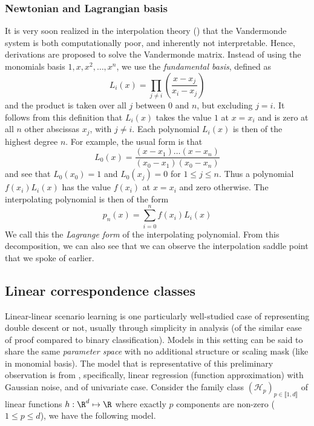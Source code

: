 \subsubsection{Newtonian and Lagrangian basis}

It is very soon realized in the interpolation theory (\cite{McArtneyInterpolation2003}) that the Vandermonde system is both computationally poor, and inherently not interpretable. Hence, derivations are proposed to solve the Vandermonde matrix. Instead of using the monomials basis $1,x,x^{2},\dots,x^{n}$, we use the \textit{fundamental basis}, defined as 
\begin{equation}
  L_{i}(x) = \prod_{j\ne i} \left(
    \frac{x-x_j}{x_i - x_j}
  \right)
\end{equation}
and the product is taken over all $j$ between $0$ and $n$, but excluding $j=i$. It follows from this definition that $L_{i}(x)$ takes the value $1$ at $x=x_{i}$ and is zero at all $n$ other abscissas $x_{j}$, with $j\neq i$. Each polynomial $L_{i}(x)$ is then of the highest degree $n$. For example, the usual form is that 
\begin{equation}
  L_{0}(x) = \frac{(x-x_1)\dots(x-x_{n})}{(x_0 - x_1)(x_0 - x_n)}
\end{equation}
and see that $L_{0}(x_0)=1$ and $L_0 (x_j)=0$ for $1\le j \le n$. Thus a polynomial $f(x_i)L_{i}(x)$ has the value $f(x_i)$ at $x=x_{i}$ and zero otherwise. The interpolating polynomial is then of the form 
\begin{equation}
  p_{n}(x) = \sum^{n}_{i=0} f(x_i)L_{i}(x)
\end{equation}
We call this the \textit{Lagrange form} of the interpolating polynomial. From this decomposition, we can also see that we can observe the interpolation saddle point that we spoke of earlier.  

\clearpage

\subsection{Linear correspondence classes}

Linear-linear scenario learning is one particularly well-studied case of representing double descent or not, usually through simplicity in analysis (of the similar ease of proof compared to binary classification). Models in this setting can be said to share the same \textit{parameter space} with no additional structure or scaling mask (like in monomial basis). The model that is representative of this preliminary observation is from \cite{lafon_understanding_2024}, specifically, linear regression (function approximation) with Gaussian noise, and of univariate case. Consider the family class $(\mathcal{H}_p)_{p\in\llbracket1,d\rrbracket}$ of linear functions $h:\R^d\mapsto \R$ where exactly $p$ components are non-zero ($1\leq p\leq d$), we have the following model.

